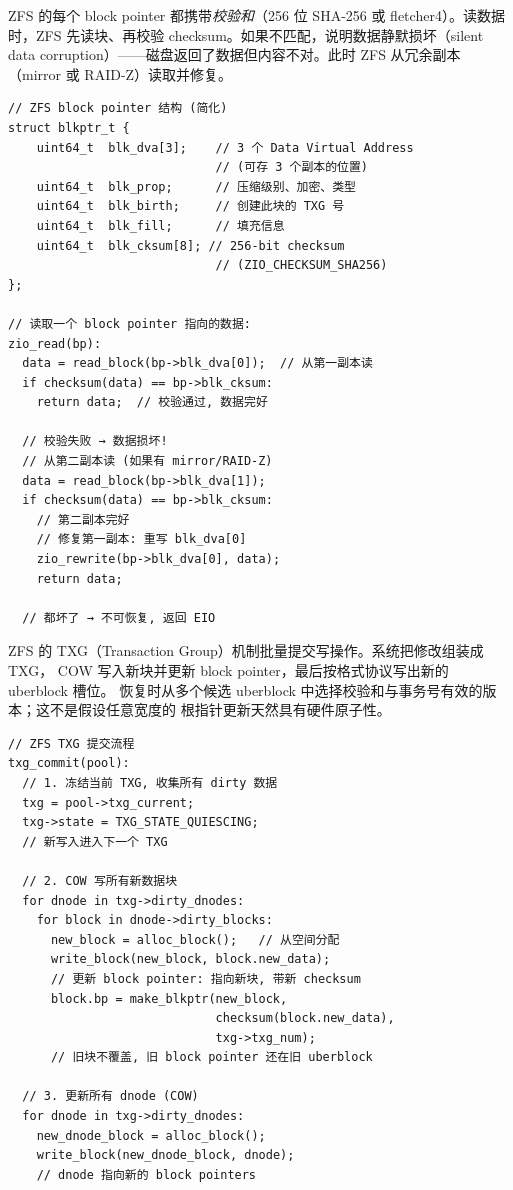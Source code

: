 \begin{filesystemlayout}
ZFS 的每个 block pointer 都携带\emph{校验和}（256 位 SHA-256 或 fletcher4）。读数据时，ZFS 先读块、再校验 checksum。如果不匹配，说明数据静默损坏（silent data corruption）——磁盘返回了数据但内容不对。此时 ZFS 从冗余副本（mirror 或 RAID-Z）读取并修复。

\begin{lstlisting}
// ZFS block pointer 结构 (简化)
struct blkptr_t {
    uint64_t  blk_dva[3];    // 3 个 Data Virtual Address
                             // (可存 3 个副本的位置)
    uint64_t  blk_prop;      // 压缩级别、加密、类型
    uint64_t  blk_birth;     // 创建此块的 TXG 号
    uint64_t  blk_fill;      // 填充信息
    uint64_t  blk_cksum[8]; // 256-bit checksum
                             // (ZIO_CHECKSUM_SHA256)
};

// 读取一个 block pointer 指向的数据:
zio_read(bp):
  data = read_block(bp->blk_dva[0]);  // 从第一副本读
  if checksum(data) == bp->blk_cksum:
    return data;  // 校验通过, 数据完好

  // 校验失败 → 数据损坏!
  // 从第二副本读 (如果有 mirror/RAID-Z)
  data = read_block(bp->blk_dva[1]);
  if checksum(data) == bp->blk_cksum:
    // 第二副本完好
    // 修复第一副本: 重写 blk_dva[0]
    zio_rewrite(bp->blk_dva[0], data);
    return data;

  // 都坏了 → 不可恢复, 返回 EIO
\end{lstlisting}

ZFS 的 TXG（Transaction Group）机制批量提交写操作。系统把修改组装成 TXG，
COW 写入新块并更新 block pointer，最后按格式协议写出新的 uberblock 槽位。
恢复时从多个候选 uberblock 中选择校验和与事务号有效的版本；这不是假设任意宽度的
根指针更新天然具有硬件原子性。

\begin{lstlisting}
// ZFS TXG 提交流程
txg_commit(pool):
  // 1. 冻结当前 TXG, 收集所有 dirty 数据
  txg = pool->txg_current;
  txg->state = TXG_STATE_QUIESCING;
  // 新写入进入下一个 TXG

  // 2. COW 写所有新数据块
  for dnode in txg->dirty_dnodes:
    for block in dnode->dirty_blocks:
      new_block = alloc_block();   // 从空间分配
      write_block(new_block, block.new_data);
      // 更新 block pointer: 指向新块, 带新 checksum
      block.bp = make_blkptr(new_block,
                             checksum(block.new_data),
                             txg->txg_num);
      // 旧块不覆盖, 旧 block pointer 还在旧 uberblock

  // 3. 更新所有 dnode (COW)
  for dnode in txg->dirty_dnodes:
    new_dnode_block = alloc_block();
    write_block(new_dnode_block, dnode);
    // dnode 指向新的 block pointers


\end{lstlisting}
\end{filesystemlayout}
